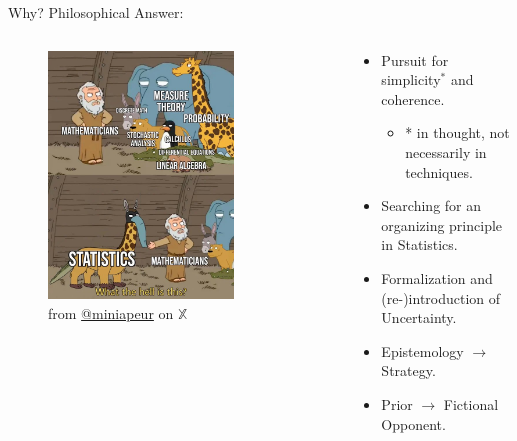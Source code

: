 \documentclass{beamer}
\theoremstyle{definition}
\begin{document}
\begin{frame}{Why? Philosophical Answer:}

\begin{columns}

\begin{column}{0.5\textwidth}
    \begin{figure}
    \centering
        \includegraphics[width=0.75\textwidth]{img/StatisticsMeme.jpeg}
        \caption{\small from \href{https://twitter.com/miniapeur/status/1673275056812597248/photo/1}{@miniapeur} on $\mathbb{X}$}
    \end{figure}
\end{column}

        \begin{column}{0.5\textwidth}
            \begin{itemize}
    \item Pursuit for simplicity$^*$ and coherence.
    \begin{itemize}
        \item * in thought, not necessarily in techniques.
    \end{itemize}
    \item Searching for an organizing principle in Statistics.
    \item Formalization and (re-)introduction of Uncertainty.
    \item Epistemology $\to$ Strategy.
    \item Prior $\to$ Fictional Opponent.
\end{itemize}
        \end{column}

\end{columns}

\end{frame}
\end{document}
